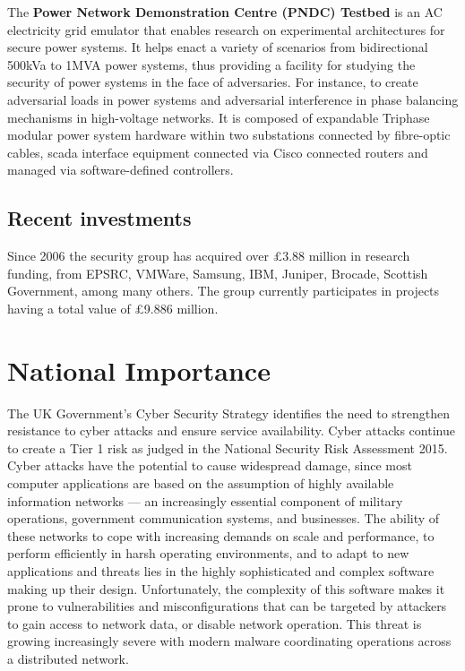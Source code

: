 \documentclass[11pt]{article}
\begin{document}
    The {\bf Power Network Demonstration Centre (PNDC) Testbed} is an
    AC electricity grid emulator that enables research on experimental
    architectures for secure power systems. It helps enact a variety
    of scenarios from bidirectional 500kVa to 1MVA power systems, thus
    providing a facility for studying the security of power systems in
    the face of adversaries. For instance, to create adversarial loads
    in power systems and adversarial interference in phase balancing
    mechanisms in high-voltage networks. It is composed of expandable
    Triphase modular power system hardware within two substations
    connected by fibre-optic cables, scada interface equipment
    connected via Cisco connected routers and managed via
    software-defined controllers.
    
    \subsection{Recent investments}
    Since 2006 the security group has acquired over
    \pounds 3.88 million %
    in research funding, from EPSRC, VMWare, Samsung, IBM, Juniper, Brocade, Scottish Government, among many others. The group currently participates in projects having a total value of   \pounds 9.886 million. %
    

    \section{National Importance}
The UK Government's Cyber Security Strategy identifies the need to
strengthen resistance to cyber attacks and ensure service
availability.  Cyber attacks continue to create a Tier 1 risk as judged in the National Security Risk Assessment 2015.  Cyber attacks have the  potential to cause widespread
damage, since most computer applications are based on the assumption
of highly available information networks --- an increasingly essential
component of military operations, government communication systems,
and businesses.   The ability of these networks to cope with
  increasing demands on scale and performance, to perform efficiently
  in harsh operating environments, and to adapt to new applications
  and threats lies in the highly sophisticated and complex software
  making up their design. Unfortunately, the complexity of this
  software makes it prone to vulnerabilities and misconfigurations
  that can be targeted by attackers to gain access to network data, or
  disable network operation.  This threat is growing increasingly
  severe with modern malware coordinating operations across a
  distributed network.
\end{document}
